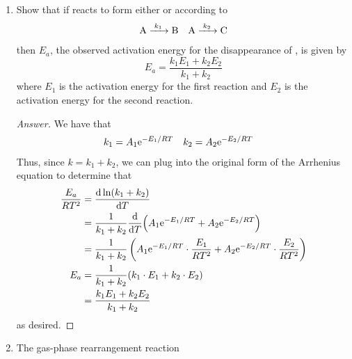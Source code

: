 \documentclass[../psets.tex]{subfiles}
\begin{document}
\begin{enumerate}[label={\textbf{28-\arabic*.}},leftmargin=3.5em]
\begin{proof}[Answer]
\begin{align*}
            &= k_1(-4\cnc[2,eq]{A}\Delta\cnc{D}+4\Delta\cnc{D}^2)-k_{-1}\Delta\cnc{D}\\
            &= -(4k_1\cnc[2,eq]{A}+k_{-1})\Delta\cnc{D}+O(\Delta\cnc{D}^2)
        \end{align*}
        so that integrating yields
        \begin{equation*}
            \Delta\cnc{D} = \Delta\cnc[0]{D}\e[-t/\tau]
        \end{equation*}
        where $\tau=1/(4k_1\cnc[2,eq]{A}+k_{-1})$.
    \end{proof}
    \setcounter{enumi}{45}
    \item Show that if  reacts to form either  or  according to
    \begin{align*}
        \ce{A ->[$k_1$] B}&&
        \ce{A ->[$k_2$] C}
    \end{align*}
    then $E_a$, the observed activation energy for the disappearance of , is given by
    \begin{equation*}
        E_a = \frac{k_1E_1+k_2E_2}{k_1+k_2}
    \end{equation*}
    where $E_1$ is the activation energy for the first reaction and $E_2$ is the activation energy for the second reaction.
    \begin{proof}[Answer]
        We have that
        \begin{align*}
            k_1 &= A_1\e[-E_1/RT]&
            k_2 &= A_2\e[-E_2/RT]
        \end{align*}
        Thus, since $k=k_1+k_2$, we can plug into the original form of the Arrhenius equation to determine that
        \begin{align*}
            \frac{E_a}{RT^2} &= \dv{\ln(k_1+k_2)}{T}\\
            &= \frac{1}{k_1+k_2}\dv{T}(A_1\e[-E_1/RT]+A_2\e[-E_2/RT])\\
            &= \frac{1}{k_1+k_2}\left( A_1\e[-E_1/RT]\cdot\frac{E_1}{RT^2}+A_2\e[-E_2/RT]\cdot\frac{E_2}{RT^2} \right)\\
            E_a &= \frac{1}{k_1+k_2}(k_1\cdot E_1+k_2\cdot E_2)\\
            &= \frac{k_1E_1+k_2E_2}{k_1+k_2}
        \end{align*}
        as desired.
    \end{proof}
    \item The gas-phase rearrangement reaction
    \begin{center}
        \footnotesize

\end{center}
\end{enumerate}
\end{document}
